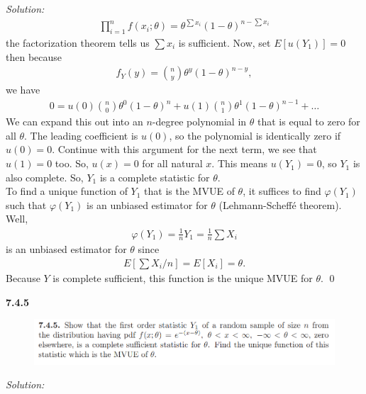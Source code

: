 \documentclass{book}
\theoremstyle{definition}
\newcommand{\f}[2]{\frac{#1}{#2}}
\begin{document}
\noindent \textit{Solution:}
\begin{align*}
\prod^n_{i=1}f(x_i;\theta) = \theta^{\sum x_i} (1-\theta)^{n-\sum x_i}
\end{align*}
the factorization theorem tells us $\sum x_i$ is sufficient. Now, set $E[u(Y_1)] = 0$ then because
\begin{align}
f_Y(y) = {{n}\choose{y}}\theta^y (1-\theta)^{n-y},
\end{align}
we have
\begin{align}
0 = u(0){{n}\choose{0}} \theta^0 (1-\theta)^n + u(1) {{n}\choose{1}} \theta^1 (1-\theta)^{n-1} + \dots
\end{align}
We can expand this out into an $n$-degree polynomial in $\theta$ that is equal to zero for all $\theta$. The leading coefficient is $u(0)$, so the polynomial is identically zero if $u(0) = 0$. Continue with this argument for the next term, we see that $u(1) = 0$ too. So, $u(x) = 0$ for all natural $x$. This means $u(Y_1) = 0$, so $Y_1$ is also complete. So, $Y_1$ is a complete statistic for $\theta$. \\

To find a unique function of $Y_1$ that is the MVUE of $\theta$, it suffices to find $\varphi(Y_1)$ such that $\varphi(Y_1)$ is an unbiased estimator for $\theta$ (Lehmann-Scheff\'e theorem).  Well,
\begin{align*}
\varphi(Y_1) = \f{1}{n}Y_1 = \f{1}{n}\sum X_i
\end{align*}
is an unbiased estimator for $\theta$ since
\begin{align*}
E[\sum X_i/n] = E[X_i] = \theta.
\end{align*}
Because $Y$ is complete sufficient, this function is the unique MVUE for $\theta$. \qed




\newpage





\noindent\textbf{7.4.5}
\begin{figure}[!htb]
	\centering
	\includegraphics[scale=1]{745}
\end{figure}



\noindent \textit{Solution:} 
\newpage
\end{document}
